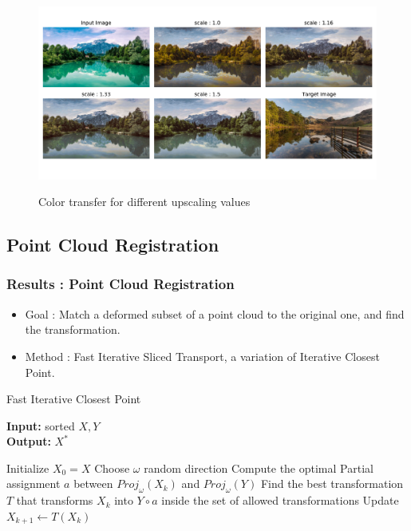 \documentclass[11pt]{beamer}
\begin{document}
\begin{frame}
\begin{figure}
\includegraphics[width = \textwidth]{landscape12_6.pdf} \label{12_fig}
\caption{Color transfer for different upscaling values}
\end{figure}
\end{frame}

\subsection{Point Cloud Registration}

\begin{frame}
\frametitle{Results : Point Cloud Registration}



\begin{itemize}
\item Goal : Match a deformed subset of a point cloud to the original one, and find the transformation.
\item Method : Fast Iterative Sliced Transport, a variation of {\color{red}Iterative Closest Point}.
\end{itemize}

\begin{algorithm}[H]
\caption{Fast Iterative Closest Point}\label{FIST}
\scriptsize
\hspace*{\algorithmicindent} \textbf{Input:} sorted $X,Y$\\
\hspace*{\algorithmicindent} \textbf{Output:} $X^*$ 
\begin{algorithmic}[2]
\State Initialize $X_0=X$
	\State Choose $\omega$ random direction
	\State Compute the optimal Partial assignment $a$ between $Proj_\omega(X_k)$ and $Proj_\omega(Y)$
	\State Find the best transformation $T$ that transforms $X_k$ into $Y \circ a$ inside the set of allowed transformations
	\State Update $X_{k+1} \gets T(X_k)$
\EndFor
\State {}
\end{algorithmic}
\end{algorithm}

\end{frame}
\end{document}
